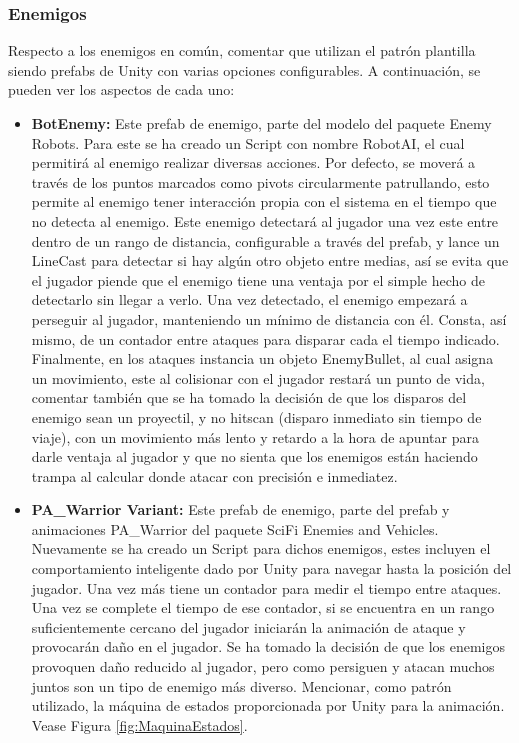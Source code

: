 \subsubsection{Enemigos}
Respecto a los enemigos en común, comentar que utilizan el patrón plantilla siendo prefabs de Unity con varias opciones configurables. A continuación, se pueden ver los aspectos de cada uno:
\begin{itemize}
	\item \textbf{BotEnemy:} Este prefab de enemigo, parte del modelo del paquete Enemy Robots. Para este se ha creado un Script con nombre RobotAI, el cual permitirá al enemigo realizar diversas acciones. Por defecto, se moverá a través de los puntos marcados como pivots circularmente patrullando, esto permite al enemigo tener interacción propia con el sistema en el tiempo que no detecta al enemigo. Este enemigo detectará al jugador una vez este entre dentro de un rango de distancia, configurable a través del prefab, y lance un LineCast para detectar si hay algún otro objeto entre medias, así se evita que el jugador piende que el enemigo tiene una ventaja por el simple hecho de detectarlo sin llegar a verlo. Una vez detectado, el enemigo empezará a perseguir al jugador, manteniendo un mínimo de distancia con él. Consta, así mismo, de un contador entre ataques para disparar cada el tiempo indicado. Finalmente, en los ataques instancia un objeto EnemyBullet, al cual asigna un movimiento, este al colisionar con el jugador restará un punto de vida, comentar también que se ha tomado la decisión de que los disparos del enemigo sean un proyectil, y no hitscan (disparo inmediato sin tiempo de viaje), con un movimiento más lento y retardo a la hora de apuntar para darle ventaja al jugador y que no sienta que los enemigos están haciendo trampa al calcular donde atacar con precisión e inmediatez.
	\item \textbf{PA\_Warrior Variant:} Este prefab de enemigo, parte del prefab y animaciones PA\_Warrior del paquete SciFi Enemies and Vehicles. Nuevamente se ha creado un Script para dichos enemigos, estes incluyen el comportamiento inteligente dado por Unity para navegar hasta la posición del jugador. Una vez más tiene un contador para medir el tiempo entre ataques. Una vez se complete el tiempo de ese contador, si se encuentra en un rango suficientemente cercano del jugador iniciarán la animación de ataque y provocarán daño en el jugador. Se ha tomado la decisión de que los enemigos provoquen daño reducido al jugador, pero como persiguen y atacan muchos juntos son un tipo de enemigo más diverso. Mencionar, como patrón utilizado, la máquina de estados proporcionada por Unity para la animación. Vease Figura \ref{fig:MaquinaEstados}.
\end{itemize}

